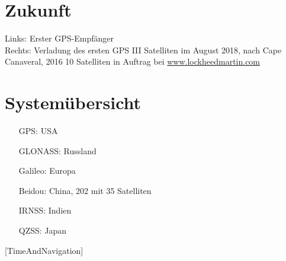 \section{Zukunft}
\label{sec:zukunft}

Links: Erster GPS-Empfänger \\
Rechts: Verladung des ersten GPS III Satelliten im August 2018, nach Cape Canaveral, 2016 10 Satelliten in Auftrag bei \url{www.lockheedmartin.com}

\section{Systemübersicht}
\begin{itemize}
    \item[GPS:] USA
    \item[GLONASS:] Russland
    \item[Galileo:] Europa
    \item[Beidou:] China, 202 mit 35 Satelliten
    \item[IRNSS:] Indien
    \item[QZSS:] Japan
\end{itemize}
{\small [TimeAndNavigation]}
